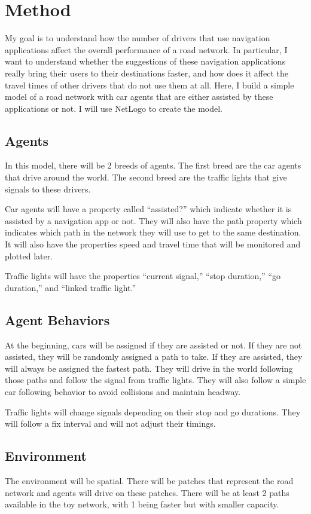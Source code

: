 \section{Method}
My goal is to understand how the number of drivers that use navigation applications affect the overall performance of a road network. In particular, I want to understand whether the suggestions of these navigation applications really bring their users to their destinations faster, and how does it affect the travel times of other drivers that do not use them at all. Here, I build a simple model of a road network with car agents that are either assisted by these applications or not. I will use NetLogo to create the model.

\subsection{Agents}
In this model, there will be 2 breeds of agents. The first breed are the car agents that drive around the world. The second breed are the traffic lights that give signals to these drivers.

Car agents will have a property called “assisted?” which indicate whether it is assisted by a navigation app or not. They will also have the path property which indicates which path in the network they will use to get to the same destination. It will also have the properties speed and travel time that will be monitored and plotted later. 

Traffic lights will have the properties “current signal,” “stop duration,” “go duration,” and “linked traffic light.”

\subsection{Agent Behaviors}
At the beginning, cars will be assigned if they are assisted or not. If they are not assisted, they will be randomly assigned a path to take. If they are assisted, they will always be assigned the fastest path. They will drive in the world following those paths and follow the signal from traffic lights. They will also follow a simple car following behavior to avoid collisions and maintain headway.

Traffic lights will change signals depending on their stop and go durations. They will follow a fix interval and will not adjust their timings. 

\subsection{Environment}
The environment will be spatial. There will be patches that represent the road network and agents will drive on these patches. There will be at least 2 paths available in the toy network, with 1 being faster but with smaller capacity.


